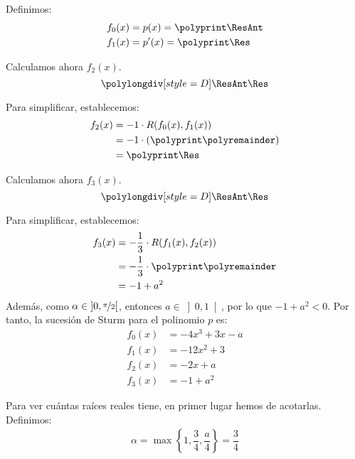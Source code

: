 \begin{ejercicio}
\begin{enumerate}
        Definimos:
        \polymul{}
        \polymul{}
        \begin{align*}
            f_0(x) &= p(x)=\polyprint\ResAnt\\
            f_1(x) &= p'(x)=\polyprint\Res
        \end{align*}

        Calculamos ahora $f_2(x)$.
        \begin{equation*}
            \polylongdiv[style=D]\ResAnt\Res
        \end{equation*}
        \polydiv\div\ResAnt\Res
        \polymul\ResAnt{}
        \polymul\Res{}

        Para simplificar, establecemos:
        \begin{align*}
            f_2(x) &= -1\cdot R(f_0(x), f_1(x))\\
            &= -1\cdot \left(\polyprint\polyremainder\right)\\
            &= \polyprint\Res
        \end{align*}

        Calculamos ahora $f_3(x)$.
        \begin{equation*}
            \polylongdiv[style=D]\ResAnt\Res
        \end{equation*}
        \polydiv\div\ResAnt\Res
        \polymul\ResAnt{}
        \polymul\Res{}

        Para simplificar, establecemos:
        \begin{align*}
            f_3(x) &= -\frac{1}{3}\cdot R(f_1(x), f_2(x))\\
            &= -\frac{1}{3}\cdot \polyprint\polyremainder\\
            &= -1+a^2
        \end{align*}
        Además, como $\alpha\in \left]0,\nicefrac{\pi}{2}\right[$, entonces $a\in \left]0, 1\right[$, por lo que $-1+a^2<0$. Por tanto, la sucesión de Sturm para el polinomio $p$ es:
        \begin{align*}
            f_0(x) &= -4x^3 + 3x - a\\
            f_1(x) &= -12x^2 + 3\\
            f_2(x) &= -2x+a\\
            f_3(x) &= -1+a^2
        \end{align*}

        Para ver cuántas raíces reales tiene, en primer lugar hemos de acotarlas. Definimos:
        \begin{align*}
            \alpha=\max\left\{1,\dfrac{3}{4},\dfrac{a}{4}\right\}=\dfrac{3}{4}
        \end{align*}
        

\end{enumerate}
\end{ejercicio}
